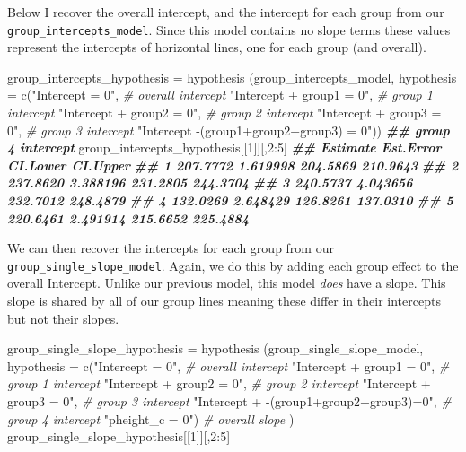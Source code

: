 \documentclass[
]{book}
\newenvironment{Shaded}{\begin{snugshade}}{\end{snugshade}}
\newcommand{\AttributeTok}[1]{\textcolor[rgb]{0.77,0.63,0.00}{#1}}
\newcommand{\CommentTok}[1]{\textcolor[rgb]{0.56,0.35,0.01}{\textit{#1}}}
\newcommand{\DecValTok}[1]{\textcolor[rgb]{0.00,0.00,0.81}{#1}}
\newcommand{\DocumentationTok}[1]{\textcolor[rgb]{0.56,0.35,0.01}{\textbf{\textit{#1}}}}
\newcommand{\FunctionTok}[1]{\textcolor[rgb]{0.00,0.00,0.00}{#1}}
\newcommand{\NormalTok}[1]{#1}
\newcommand{\OtherTok}[1]{\textcolor[rgb]{0.56,0.35,0.01}{#1}}
\newcommand{\SpecialCharTok}[1]{\textcolor[rgb]{0.00,0.00,0.00}{#1}}
\newcommand{\StringTok}[1]{\textcolor[rgb]{0.31,0.60,0.02}{#1}}
\begin{document}
Below I recover the overall intercept, and the intercept for each group from our \texttt{group\_intercepts\_model}. Since this model contains no slope terms these values represent the intercepts of horizontal lines, one for each group (and overall).

\begin{Shaded}
\begin{Highlighting}[]
\NormalTok{group\_intercepts\_hypothesis }\OtherTok{=} 
  \FunctionTok{hypothesis}\NormalTok{ (group\_intercepts\_model,}
              \AttributeTok{hypothesis =} 
                \FunctionTok{c}\NormalTok{(}\StringTok{"Intercept = 0"}\NormalTok{,  }\CommentTok{\# overall intercept}
                \StringTok{"Intercept + group1 = 0"}\NormalTok{,  }\CommentTok{\# group 1 intercept}
                \StringTok{"Intercept + group2 = 0"}\NormalTok{,  }\CommentTok{\# group 2 intercept}
                \StringTok{"Intercept + group3 = 0"}\NormalTok{,  }\CommentTok{\# group 3 intercept}
                \StringTok{"Intercept {-}(group1+group2+group3) = 0"}\NormalTok{)) }\DocumentationTok{\#\# group 4 intercept}
\NormalTok{group\_intercepts\_hypothesis[[}\DecValTok{1}\NormalTok{]][,}\DecValTok{2}\SpecialCharTok{:}\DecValTok{5}\NormalTok{]}
\DocumentationTok{\#\#   Estimate Est.Error CI.Lower CI.Upper}
\DocumentationTok{\#\# 1 207.7772  1.619998 204.5869 210.9643}
\DocumentationTok{\#\# 2 237.8620  3.388196 231.2805 244.3704}
\DocumentationTok{\#\# 3 240.5737  4.043656 232.7012 248.4879}
\DocumentationTok{\#\# 4 132.0269  2.648429 126.8261 137.0310}
\DocumentationTok{\#\# 5 220.6461  2.491914 215.6652 225.4884}
\end{Highlighting}
\end{Shaded}

We can then recover the intercepts for each group from our \texttt{group\_single\_slope\_model}. Again, we do this by adding each group effect to the overall Intercept. Unlike our previous model, this model \emph{does} have a slope. This slope is shared by all of our group lines meaning these differ in their intercepts but not their slopes.

\begin{Shaded}
\begin{Highlighting}[]
\NormalTok{group\_single\_slope\_hypothesis }\OtherTok{=} 
  \FunctionTok{hypothesis}\NormalTok{ (group\_single\_slope\_model,}
              \AttributeTok{hypothesis =} 
                \FunctionTok{c}\NormalTok{(}\StringTok{"Intercept = 0"}\NormalTok{, }\CommentTok{\# overall intercept}
                  \StringTok{"Intercept + group1 = 0"}\NormalTok{,  }\CommentTok{\# group 1 intercept}
                  \StringTok{"Intercept + group2 = 0"}\NormalTok{,  }\CommentTok{\# group 2 intercept}
                  \StringTok{"Intercept + group3 = 0"}\NormalTok{,  }\CommentTok{\# group 3 intercept}
                  \StringTok{"Intercept + {-}(group1+group2+group3)=0"}\NormalTok{, }\CommentTok{\# group 4 intercept}
                  \StringTok{"pheight\_c = 0"}\NormalTok{) }\CommentTok{\# overall slope}
\NormalTok{)   }
\NormalTok{group\_single\_slope\_hypothesis[[}\DecValTok{1}\NormalTok{]][,}\DecValTok{2}\SpecialCharTok{:}\DecValTok{5}\NormalTok{]}
\end{Highlighting}
\end{Shaded}
\end{document}
